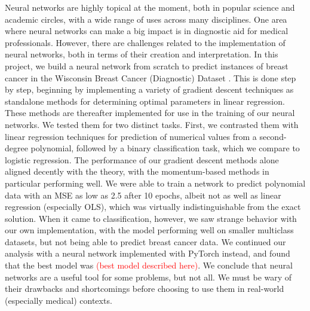 \begin{adjustwidth}{2cm}{2cm} %
    Neural networks are highly topical at the moment, both in popular science and academic circles, with a wide range of uses across many disciplines. One area where neural networks can make a big impact is in diagnostic aid for medical professionals. However, there are challenges related to the implementation of neural networks, both in terms of their creation and interpretation. In this project, we build a neural network from scratch to predict instances of breast cancer in the Wisconsin Breast Cancer (Diagnostic) Dataset \cite{sklearnBreastCancerData}. This is done step by step, beginning by implementing a variety of gradient descent techniques as standalone methods for determining optimal parameters in linear regression. These methods are thereafter implemented for use in the training of our neural networks. We tested them for two distinct tasks. First, we contrasted them with linear regression techniques for prediction of numerical values from a second-degree polynomial, followed by a binary classification task, which we compare to logistic regression. The performance of our gradient descent methods alone aligned decently with the theory, with the momentum-based methods in particular performing well. We were able to train a network to predict polynomial data with an MSE as low as 2.5 after 10 epochs, albeit not as well as linear regression (especially OLS), which was virtually indistinguishable from the exact solution. When it came to classification, however, we saw strange behavior with our own implementation, with the model performing well on smaller multiclass datasets, but not being able to predict breast cancer data. We continued our analysis with a neural network implemented with PyTorch instead, and found that the best model was \textcolor{red}{(best model described here)}. We conclude that neural networks are a useful tool for some problems, but not all. We must be wary of their drawbacks and shortcomings before choosing to use them in real-world (especially medical) contexts.
      \end{adjustwidth}

